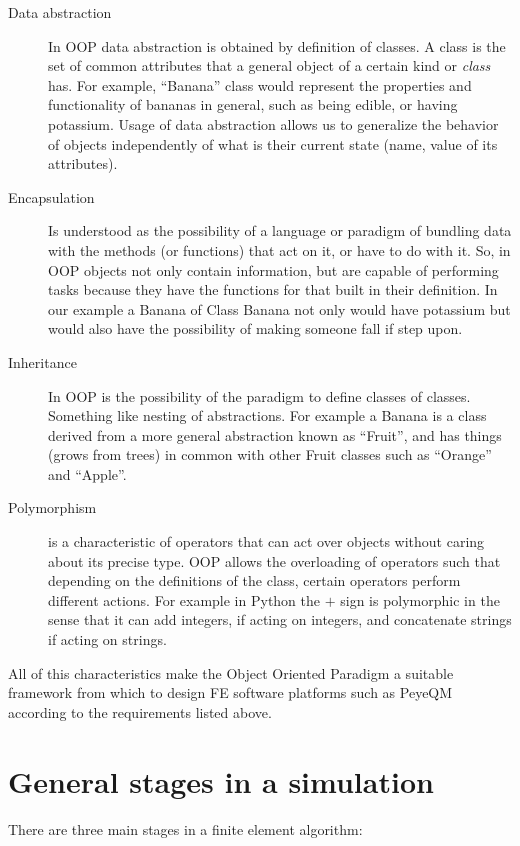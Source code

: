 \begin{description}
\item[Data abstraction] In OOP data abstraction is obtained by definition of classes. A class is the set of common attributes that a general object of a certain kind or \textit{class} has. For example, ``Banana'' class would represent the properties and functionality of bananas in general, such as being edible, or having potassium. Usage of data abstraction allows us to generalize the behavior of objects independently of what is their current state (name, value of its attributes).  
\item[Encapsulation] Is understood as the possibility of a language or paradigm of bundling data with the methods (or functions) that act on it, or have to do with it. So, in OOP objects not only contain information, but are capable of performing tasks because they have the functions for that built in their definition. In our example a Banana of Class Banana not only would have potassium but would also have the possibility of making someone fall if step upon.
\item[Inheritance] In OOP is the possibility of the paradigm to define classes of classes. Something like nesting of abstractions. For example a Banana is a class derived from a more general abstraction known as ``Fruit'', and has things (grows from trees) in common with other Fruit classes such as ``Orange'' and ``Apple''.
\item[Polymorphism] is a characteristic of operators that can act over objects without caring about its precise type. OOP allows the overloading of operators such that depending on the definitions of the class, certain operators perform different actions. For example in Python the $+$ sign is polymorphic in the sense that it can add integers, if acting on integers, and concatenate strings if acting on strings.
\end{description}

All of this characteristics make the Object Oriented Paradigm a suitable framework from which to design FE software platforms such as PeyeQM according to the requirements listed above.

\section{General stages in a simulation}

There are three main stages in a finite element algorithm:

